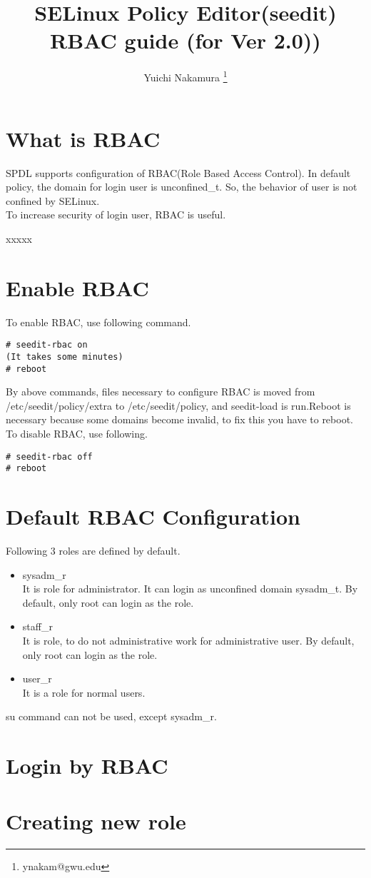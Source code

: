 \documentclass{article}
\title{SELinux Policy Editor(seedit) RBAC guide (for Ver 2.0))}
\author{Yuichi Nakamura \thanks{ynakam@gwu.edu}}
\begin{document}
\def\labelenumi{(\theenumi)}
\maketitle
\tableofcontents
\newpage


\section{What is RBAC}
SPDL supports configuration of RBAC(Role Based Access Control).
In default policy, the domain for login user is unconfined\_t.
So, the behavior of user is not confined by SELinux.\\

To increase security of login user, RBAC is useful.

xxxxx

\section{Enable RBAC}
To enable RBAC, use following command.
\begin{verbatim}
# seedit-rbac on
(It takes some minutes)
# reboot
\end{verbatim}
By above commands, files necessary to configure RBAC is moved from
/etc/seedit/policy/extra to /etc/seedit/policy, and seedit-load is
run.Reboot is necessary because some domains become invalid, to fix this
you have to reboot.\\

To disable RBAC, use following.
\begin{verbatim}
# seedit-rbac off
# reboot
\end{verbatim}

\section{Default RBAC Configuration}
Following 3 roles are defined by default.

\begin{itemize}
 \item sysadm\_r\\
       It is role for administrator. It can login as unconfined
       domain sysadm\_t. By default, only root can login as the role.
 \item staff\_r \\
       It is role, to do not administrative work for administrative
       user.
       By default, only root can login as the role.
 \item user\_r \\
       It is a role for normal users.
       
\end{itemize}

su command can not be used, except sysadm\_r.

\section{Login by RBAC}



\section{Creating new role}
\end{document}
